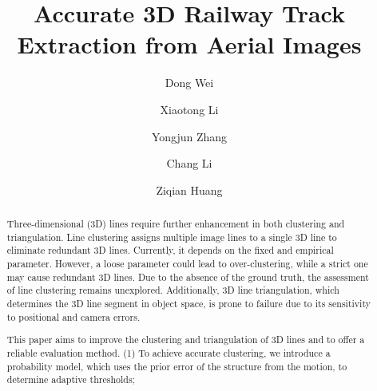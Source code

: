 \documentclass[a4paper]{cas-sc}
\begin{document}
\linenumbers
\let\WriteBookmarks\relax
\def\floatpagepagefraction{1}

\shorttitle{}

\title [mode = title]{
Accurate 3D Railway Track Extraction from Aerial Images}                      


%
\author[1]{Dong Wei}
\fnmark[1]
\author[1]{Xiaotong Li}
\fnmark[1]
\author[1]{Yongjun Zhang}
\cormark[1]
\author[2]{Chang Li}

\author[1]{Ziqian Huang}
\fnmark[1]







\begin{abstract}
Three-dimensional (3D) lines require further enhancement in both clustering and triangulation. 
Line clustering assigns multiple image lines to a single 3D line to eliminate redundant 3D lines.
Currently, it depends on the fixed and empirical parameter.
However,
a loose parameter could lead to over-clustering, 
while a strict one may cause redundant 3D lines. 
Due to the absence of the ground truth, 
the assessment of line clustering remains unexplored.
Additionally, 
3D line triangulation, 
which determines the 3D line segment in object space, 
is prone to failure due to its sensitivity to positional and camera errors.

\noindent This paper aims to improve the clustering and triangulation of 3D lines and to offer a reliable evaluation method. 
(1) To achieve accurate clustering, 
we introduce a probability model,
which uses the prior error of the structure from the motion,
to determine adaptive thresholds;
\end{abstract}
\end{document}
